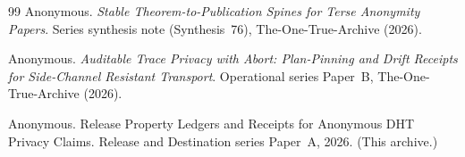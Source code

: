 \documentclass[11pt]{article}
\begin{document}
\begin{thebibliography}{99}
Anonymous.
\newblock \emph{Stable Theorem-to-Publication Spines for Terse Anonymity Papers}.
\newblock Series synthesis note (Synthesis~76), The-One-True-Archive (2026).

Anonymous.
\newblock \emph{Auditable Trace Privacy with Abort: Plan-Pinning and Drift Receipts for Side-Channel Resistant Transport}.
\newblock Operational series Paper~B, The-One-True-Archive (2026).



Anonymous.
\newblock Release Property Ledgers and Receipts for Anonymous DHT Privacy Claims.
\newblock Release and Destination series Paper~A, 2026. (This archive.)

\end{thebibliography}
\end{document}

